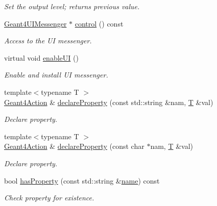 \begin{DoxyCompactItemize}
\begin{DoxyCompactList}\small\item\em Set the output level; returns previous value. \end{DoxyCompactList}\item 
\hyperlink{class_d_d4hep_1_1_simulation_1_1_geant4_u_i_messenger}{Geant4\+U\+I\+Messenger} $\ast$ \hyperlink{class_d_d4hep_1_1_simulation_1_1_geant4_action_a1bdb7c4a8b5a40c4fbae05068c1e8c93}{control} () const
\begin{DoxyCompactList}\small\item\em Access to the UI messenger. \end{DoxyCompactList}\item 
virtual void \hyperlink{class_d_d4hep_1_1_simulation_1_1_geant4_action_a3cc9526eece0aaceec6b62fa74d8c055}{enable\+UI} ()
\begin{DoxyCompactList}\small\item\em Enable and install UI messenger. \end{DoxyCompactList}\item 
{\footnotesize template$<$typename T $>$ }\\\hyperlink{class_d_d4hep_1_1_simulation_1_1_geant4_action}{Geant4\+Action} \& \hyperlink{class_d_d4hep_1_1_simulation_1_1_geant4_action_a51be57d542edbba2b5e4a53a7fea6315}{declare\+Property} (const std\+::string \&nam, \hyperlink{class_t}{T} \&val)
\begin{DoxyCompactList}\small\item\em Declare property. \end{DoxyCompactList}\item 
{\footnotesize template$<$typename T $>$ }\\\hyperlink{class_d_d4hep_1_1_simulation_1_1_geant4_action}{Geant4\+Action} \& \hyperlink{class_d_d4hep_1_1_simulation_1_1_geant4_action_ad00f53780d6155fb3ab806a68a284762}{declare\+Property} (const char $\ast$nam, \hyperlink{class_t}{T} \&val)
\begin{DoxyCompactList}\small\item\em Declare property. \end{DoxyCompactList}\item 
bool \hyperlink{class_d_d4hep_1_1_simulation_1_1_geant4_action_ad2ba790e944389191e28f1e618da33b1}{has\+Property} (const std\+::string \&\hyperlink{class_d_d4hep_1_1_simulation_1_1_geant4_action_af374e70b014d16afb81dd9d77cc3894b}{name}) const
\begin{DoxyCompactList}\small\item\em Check property for existence. \end{DoxyCompactList}\item 

\end{DoxyCompactItemize}
